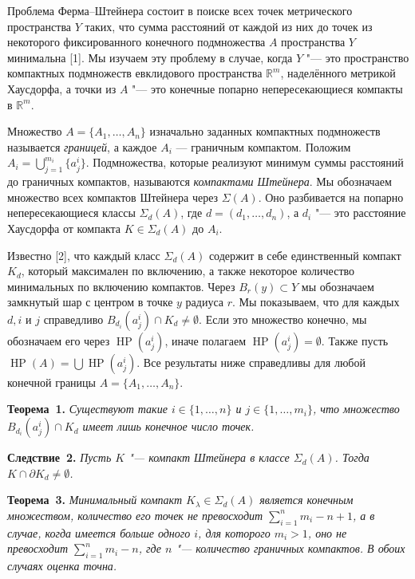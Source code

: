\vzmscaption

Проблема Ферма--Штейнера состоит в поиске всех точек метрического пространства $Y$ таких, что сумма расстояний от каждой из них до точек из некоторого фиксированного конечного подмножества $A$ пространства $Y$ минимальна [1]. Мы изучаем эту проблему в случае, когда $Y$ "--- это пространство компактных подмножеств евклидового пространства $\mathbb{R}^m$, наделённого метрикой Хаусдорфа, а точки из $A$ "--- это конечные попарно непересекающиеся компакты в $\mathbb{R}^m$.

Множество $A = \{A_1, \ldots, A_n\}$ изначально заданных компактных подмножеств называется \emph{границей}, а каждое $A_i$ — граничным компактом. Положим $A_i = \bigcup_{j=1}^{m_i} \{a^i_j\}$. Подмножества, которые реализуют минимум суммы расстояний до граничных компактов, называются \emph{компактами Штейнера}. Мы обозначаем множество всех компактов Штейнера через $\Sigma(A)$. Оно разбивается на попарно непересекающиеся классы $\Sigma_d(A)$, где $d = (d_1, \ldots, d_n)$, а $d_i$ "--- это расстояние Хаусдорфа от компакта $K\in \Sigma_d(A)$ до $A_i$.

Известно [2], что каждый класс $\Sigma_d(A)$ содержит в себе единственный компакт $K_d$, который максимален по включению, а также некоторое количество минимальных по включению компактов. Через $B_r(y) \subset Y$ мы обозначаем замкнутый шар с центром в точке $y$ радиуса $r$. Мы показываем, что для каждых $d, i$ и $j$ справедливо $B_{d_i} (a^i_j) \cap K_d \neq \emptyset$. Если это множество конечно, мы обозначаем его через $\operatorname{HP}(a^i_j)$, иначе полагаем $\operatorname{HP}(a^i_j)=\emptyset$. Также пусть $\operatorname{HP}(A)=\bigcup \operatorname{HP}(a^i_j)$. Все результаты ниже справедливы для любой конечной границы $A = \{A_1,\ldots,A_n\}$.

\textbf{Теорема~1.} {\it Существуют такие $i \in \{1,\ldots,n\}$ и $j \in \{1,\ldots,m_i\}$, что множество $B_{d_i} (a^i_j) \cap K_d$ имеет лишь конечное число точек.}

\textbf{Следствие~2.} {\it Пусть $K$ "--- компакт Штейнера в классе $\Sigma_d(A)$. Тогда $K\cap \partial K_d\neq \emptyset$.}

\textbf{Теорема~3.} {\it Минимальный компакт $K_\lambda \in \Sigma_d(A)$ является конечным множеством, количество его точек не превосходит $\sum_{i=1}^n m_i - n + 1$, а в случае, когда имеется больше одного $i$, для которого $m_i > 1$, оно не превосходит $\sum_{i=1}^n m_i - n$, где $n$ "--- количество граничных компактов. В обоих случаях оценка точна.}

